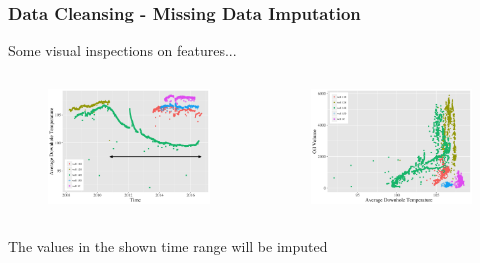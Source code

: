 \documentclass[xcolor=table]{beamer}
\begin{document}
\begin{frame}
\frametitle{Data Cleansing - Missing Data Imputation}
\begin{block}{}
Some visual inspections on features...
\end{block}
\begin{columns}[c]

\begin{figure}
\includegraphics[width=1\linewidth,left]{adt_t_copy.png} 
\end{figure}

\begin{figure}
\includegraphics[width=1\linewidth, right]{o_adt.png}
\end{figure}
\end{columns}

\begin{block}{}
The values in the shown time range will be imputed
\end{block}
\end{frame}
\end{document}
